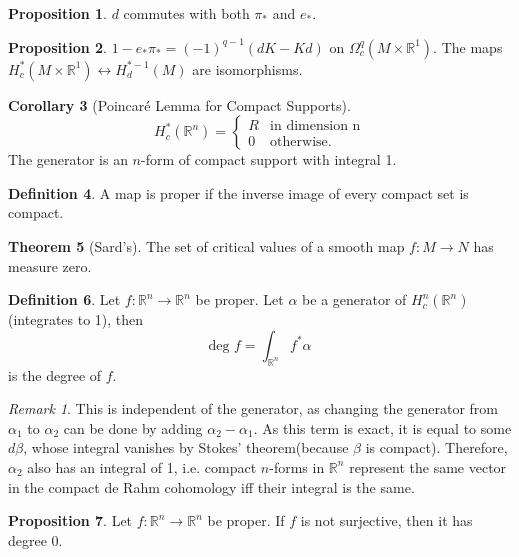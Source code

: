 \documentclass[twocolumn]{article}
\theoremstyle{definition}
\newtheorem{definition}{Definition}[section]
\newtheorem{theorem}[definition]{Theorem}
\newtheorem{proposition}[definition]{Proposition}
\newtheorem{corollary}[definition]{Corollary}
\theoremstyle{remark}
\newtheorem*{remark}{Remark}
\begin{document}
\begin{proposition}
    $d$ commutes with both $\pi_*$ and $e_*$.
\end{proposition}
\begin{proposition}
    $1 - e_* \pi_* = (-1)^{q-1}(dK - Kd)$ on $\Omega^q_c(M \times \mathbb{R}^1)$.
    The maps $H_c^*(M\times \mathbb{R}^1) \leftrightarrow H_d^{*-1}(M)$ are isomorphisms.
\end{proposition}
\begin{corollary}[Poincaré Lemma for Compact Supports]
    \begin{equation}
        H^*_c(\mathbb{R}^n) =
        \begin{cases}
            R & \textrm{in dimension n}\\
            0 & \textrm{otherwise.}
        \end{cases}
    \end{equation}
    The generator is an $n$-form of compact support with integral 1.
\end{corollary}
\begin{definition}
    A map is proper if the inverse image of every compact set is compact.
\end{definition}
\begin{theorem}[Sard's]
    The set of critical values of a smooth map $f: M \rightarrow N$ has measure zero.
\end{theorem}
\begin{definition}
    Let $f: \mathbb{R}^n \rightarrow \mathbb{R}^n$ be proper. Let $\alpha$ be a generator
    of $H^n_c(\mathbb{R}^n)$(integrates to 1), then
    \begin{equation}
        \textrm{deg }f = \int_{\mathbb{R}^n} f^*\alpha
    \end{equation}
    is the degree of $f$.
\end{definition}
\begin{remark}
    This is independent of the generator, as changing the generator from $\alpha_1$ to $\alpha_2$ can be done by adding $\alpha_2 - \alpha_1$.
    As this term is exact, it is equal to some $d\beta$, whose integral vanishes by Stokes' theorem(because $\beta$ is compact).
    Therefore, $\alpha_2$ also has an integral of 1, i.e. compact $n$-forms in $\mathbb{R}^n$ represent the same vector in the compact de Rahm cohomology iff their integral is the same.
\end{remark}
\begin{proposition}
    Let $f: \mathbb{R}^n \rightarrow \mathbb{R}^n$ be proper. If $f$ is not surjective, then it has degree 0.
\end{proposition}
\end{document}
